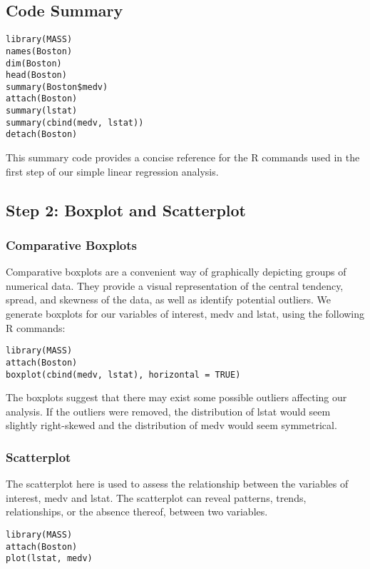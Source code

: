 \documentclass[11pt]{article}
\begin{document}
\subsection{Code Summary}

\begin{verbatim}
library(MASS)
names(Boston)
dim(Boston)
head(Boston)
summary(Boston$medv)
attach(Boston)
summary(lstat)
summary(cbind(medv, lstat))
detach(Boston)
\end{verbatim}

This summary code provides a concise reference for the R commands used in the first step of our simple linear regression analysis.

\subsection{Step 2: Boxplot and Scatterplot}

\subsubsection{Comparative Boxplots}

Comparative boxplots are a convenient way of graphically depicting groups of numerical data. They provide a visual representation of the central tendency, spread, and skewness of the data, as well as identify potential outliers. We generate boxplots for our variables of interest, medv and lstat, using the following R commands:

\begin{verbatim}
library(MASS)
attach(Boston)
boxplot(cbind(medv, lstat), horizontal = TRUE)
\end{verbatim}

The boxplots suggest that there may exist some possible outliers affecting our analysis. If the outliers were removed, the distribution of lstat would seem slightly right-skewed and the distribution of medv would seem symmetrical.

\subsubsection{Scatterplot}

The scatterplot here is used to assess the relationship between the variables of interest, medv and lstat. The scatterplot can reveal patterns, trends, relationships, or the absence thereof, between two variables.

\begin{verbatim}
library(MASS)
attach(Boston)
plot(lstat, medv)
\end{verbatim}
\end{document}
